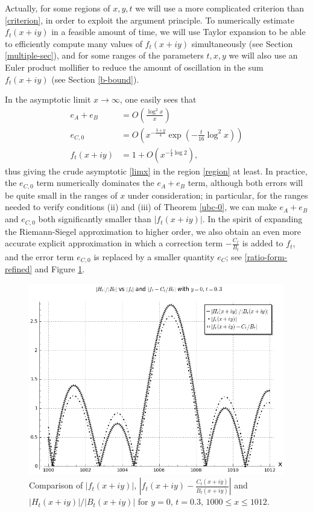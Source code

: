 Actually, for some regions of $x,y,t$ we will use a more complicated criterion than \eqref{criterion}, in order to exploit the argument principle.  To numerically estimate $f_t(x+iy)$ in a feasible amount of time, we will use Taylor expansion to be able to efficiently compute many values of $f_t(x+iy)$ simultaneously (see Section \ref{multiple-sec}), and for some ranges of the parameters $t,x,y$ we will also use an Euler product mollifier to reduce the amount of oscillation in the sum $f_t(x+iy)$ (see Section \ref{b-bound}).

In the asymptotic limit $x \to \infty$, one easily sees that 
\begin{align*}
e_A+e_B &= O\left( \frac{\log^2 x}{x} \right)\\
e_{C,0} &= O\left( x^{-\frac{3+y}{4}} \exp\left(-\frac{t}{16} \log^2 x \right) \right)\\
f_t(x+iy) &= 1 + O\left( x^{-\frac{t}{4}\log 2} \right),
\end{align*}
thus giving the crude asymptotic \eqref{limx} in the region \eqref{region} at least.   In practice, the $e_{C,0}$ term numerically dominates the $e_A+e_B$ term, although both errors will be quite small in the ranges of $x$ under consideration; in particular, for the ranges needed to verify conditions (ii) and (iii) of Theorem \ref{ubc-0}, we can make $e_A+e_B$ and $e_{C,0}$ both significantly smaller than $|f_t(x+iy)|$.  In the spirit of expanding the Riemann-Siegel approximation to higher order, we also obtain an even more accurate explicit approximation in which a correction term $-\frac{C_t}{B_t}$ is added to $f_t$, and the error term $e_{C,0}$ is replaced by a smaller quantity $e_C$; see \eqref{ratio-form-refined} and Figure \ref{htft-c}.

\begin{figure}[h!]
  \includegraphics[width=0.6\linewidth]{Extra_RS_term.png}
  \caption{Comparison of $|f_t(x+iy)|$, $|f_t(x+iy)-\frac{C_t(x+iy)}{B_t(x+iy)}|$ and $|H_t(x+iy)|/|B_t(x+iy)|$ for $y=0$, $t=0.3$, $1000 \leq x \leq 1012$.}
	\label{htft-c}
\end{figure}

